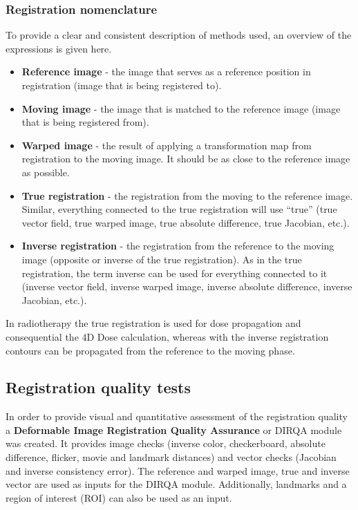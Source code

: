 \subsubsection{Registration nomenclature}

To provide a clear and consistent description of methods used, an overview of the expressions is given here.

\begin{itemize}
 \item \textbf{Reference image} - the image that serves as a reference position in registration (image that is being registered to).
 \item \textbf{Moving image} - the image that is matched to the reference image (image that is being registered from).
 \item \textbf{Warped image} - the result of applying a transformation map from registration to the moving image. It should be as close to the reference image as possible.
 \item \textbf{True registration} - the registration from the moving to the reference image. Similar, everything connected to the true registration will use ``true'' (true vector field, true warped image, true absolute difference, true Jacobian, etc.).
 \item \textbf{Inverse registration} - the registration from the reference to the moving image (opposite or inverse of the true registration). As in the true registration, the term inverse can be used for everything connected to it (inverse vector field, inverse warped image, inverse absolute difference, inverse Jacobian, etc.).
\end{itemize}

In radiotherapy the true registration is used for dose propagation and consequential the 4D Dose calculation, whereas with the inverse registration contours can be propagated from the reference to the moving phase.


\subsection{Registration quality tests}
\label{DIRQA}

In order to provide visual and quantitative assessment of the registration quality a \textbf{Deformable Image Registration Quality Assurance} or DIRQA module was created. 
It provides image checks (inverse color, checkerboard, absolute difference, flicker, movie and landmark distances) 
and vector checks (Jacobian and inverse consistency error). 
The reference and warped image, true and inverse vector are used as inputs for the DIRQA module. 
Additionally, landmarks and a region of interest (ROI) can also be used as an input.

